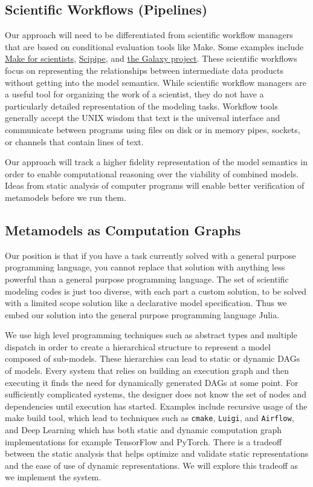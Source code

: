\documentclass{article}
\begin{document}
\subsection{Scientific Workflows (Pipelines)}
Our approach will need to be differentiated from scientific workflow managers that are based on conditional evaluation tools like Make. Some examples include \href{https://swcarpentry.github.io/make-novice/}{Make for scientists},  \href{http://scipipe.org/}{Scipipe}, and \href{https://galaxyproject.org/}{the Galaxy project}. These scientific workflows focus on representing the relationships between intermediate data products without getting into the model semantics. While scientific workflow managers are a useful tool for organizing the work of a scientist, they do not have a particularly detailed representation of the modeling tasks. Workflow tools generally accept the UNIX wisdom that text is the universal interface and communicate between programs using files on disk or in memory pipes, sockets, or channels that contain lines of text.

Our approach will track a higher fidelity representation of the model semantics in order to enable computational reasoning over the viability of combined models. Ideas from static analysis of computer programs will enable better verification of metamodels before we run them.

\subsection{Metamodels as Computation Graphs}
Our position is that if you have a task currently solved with a general purpose programming language, you cannot replace that solution with anything less powerful than a general purpose programming language. The set of scientific modeling codes is just too diverse, with each part a custom solution, to be solved with a limited scope solution like a declarative model specification. Thus we embed our solution into the general purpose programming language Julia.

We use high level programming techniques such as abstract types and multiple dispatch in order to create a hierarchical structure to represent a model composed of sub-models. These hierarchies can lead to static or dynamic DAGs of models. Every system that relies on building an execution graph and then executing it finds the need for dynamically generated DAGs at some point. For sufficiently complicated systems, the designer does not know the set of nodes and dependencies until execution has started. Examples include recursive usage of the make build tool, which lead to techniques such as \texttt{cmake}, \texttt{Luigi}, and \texttt{Airflow}, and Deep Learning which has both static and dynamic computation graph implementations for example TensorFlow and PyTorch. There is a tradeoff between the static analysis that helps optimize and validate static representations and the ease of use of dynamic representations. We will explore this tradeoff as we implement the system.
\end{document}
